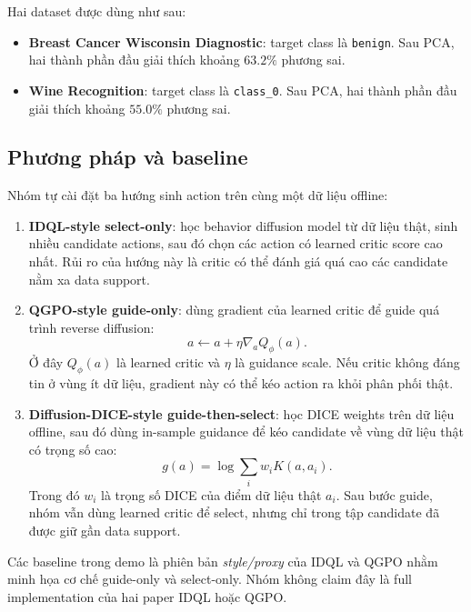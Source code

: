 Hai dataset được dùng như sau:
\begin{itemize}
    \item \textbf{Breast Cancer Wisconsin Diagnostic}: target class là \texttt{benign}.
    Sau PCA, hai thành phần đầu giải thích khoảng $63.2\%$ phương sai.
    \item \textbf{Wine Recognition}: target class là \texttt{class\_0}. Sau PCA, hai
    thành phần đầu giải thích khoảng $55.0\%$ phương sai.
\end{itemize}

\subsection{Phương pháp và baseline}

Nhóm tự cài đặt ba hướng sinh action trên cùng một dữ liệu offline:
\begin{enumerate}
    \item \textbf{IDQL-style select-only}: học behavior diffusion model từ dữ liệu thật,
    sinh nhiều candidate actions, sau đó chọn các action có learned critic score cao nhất.
    Rủi ro của hướng này là critic có thể đánh giá quá cao các candidate nằm xa data support.

    \item \textbf{QGPO-style guide-only}: dùng gradient của learned critic để guide quá
    trình reverse diffusion:
    \[
        a \leftarrow a + \eta \nabla_a Q_\phi(a).
    \]
    Ở đây $Q_\phi(a)$ là learned critic và $\eta$ là guidance scale. Nếu critic không đáng
    tin ở vùng ít dữ liệu, gradient này có thể kéo action ra khỏi phân phối thật.

    \item \textbf{Diffusion-DICE-style guide-then-select}: học DICE weights trên dữ liệu
    offline, sau đó dùng in-sample guidance để kéo candidate về vùng dữ liệu thật có trọng
    số cao:
    \[
        g(a) = \log \sum_i w_i K(a,a_i).
    \]
    Trong đó $w_i$ là trọng số DICE của điểm dữ liệu thật $a_i$. Sau bước guide, nhóm vẫn
    dùng learned critic để select, nhưng chỉ trong tập candidate đã được giữ gần data support.
\end{enumerate}

Các baseline trong demo là phiên bản \textit{style/proxy} của IDQL và QGPO nhằm minh họa
cơ chế guide-only và select-only. Nhóm không claim đây là full implementation của hai paper
IDQL hoặc QGPO.

